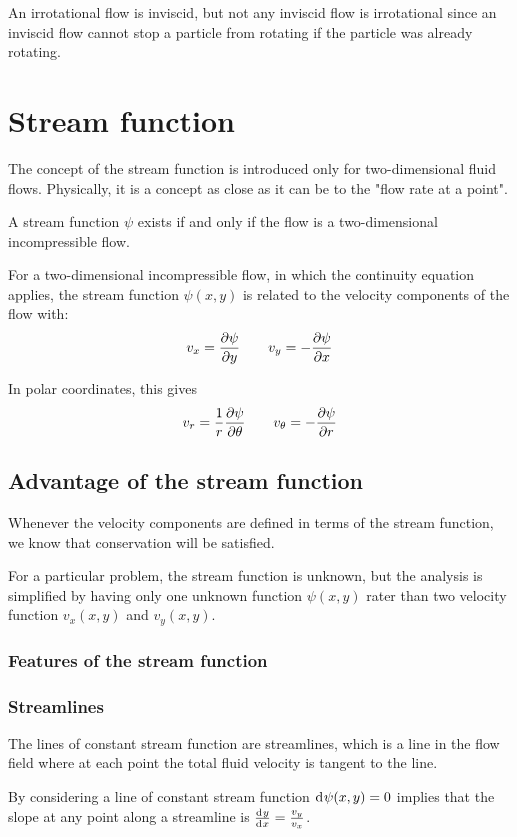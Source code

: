 \documentclass[10pt, twocolumn]{article}
\begin{document}
\begin{remark}
  An irrotational flow is inviscid, but not any inviscid flow is irrotational since an inviscid flow cannot stop a particle from rotating if the particle was already rotating.
\end{remark}


\section{Stream function}
The concept of the stream function is introduced only for two-dimensional fluid flows.
Physically, it is a concept as close as it can be to the "flow rate at a point".

A stream function \(\psi\) exists if and only if the flow is a two-dimensional incompressible flow.

For a two-dimensional incompressible flow, in which the continuity equation applies, the stream function \(\psi(x,y)\) is related to the velocity components of the flow with:
\[
  v_x = \frac{\partial \psi}{\partial y} \qquad v_y = - \frac{\partial \psi}{\partial x}
\]

In polar coordinates, this gives
\[
  v_r = \frac{1}{r}\frac{\partial \psi}{\partial \theta} \qquad v_\theta = - \frac{\partial \psi}{\partial r}
\]


\subsection{Advantage of the stream function}
Whenever the velocity components are defined in terms of the stream function, we know that conservation will be satisfied.

For a particular problem, the stream function is unknown, but the analysis is simplified by having only one unknown function \(\psi(x,y)\) rater than two velocity function \(v_x(x,y)\) and \(v_y(x,y)\).


\subsubsection{Features of the stream function}
\subsubsection{Streamlines}
The lines of constant stream function are streamlines, which is a line in the flow field where at each point the total fluid velocity is tangent to the line.

By considering a line of constant stream function \(\mathrm{d}^{} \psi(x,y) = 0\) implies that the slope at any point along a streamline is \(\frac{\mathrm{d}^{} y}{\mathrm{d}^{} x} = \frac{v_y}{v_x}\).
\end{document}
